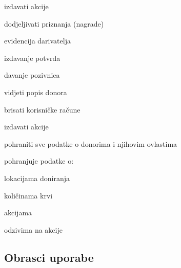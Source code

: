 \begin{packed_enum}
\begin{packed_enum}
					\end{packed_enum}
				\item  {}
				
				\begin{packed_enum}
					
					\item izdavati akcije
					\item dodjeljivati priznanja (nagrade)
					\item evidencija darivatelja
					\item izdavanje potvrda
					\item davanje pozivnica
				\end{packed_enum}

				\item {}
				\begin{packed_enum}
					
					\item vidjeti popis donora
					\item brisati korisničke račune
					\item izdavati akcije
				\end{packed_enum}
			
				\item {}
				\begin{packed_enum}
					
					\item pohraniti sve podatke o donorima i njihovim ovlastima
					\item pohranjuje podatke o:
						\begin{packed_enum}
						
							\item lokacijama doniranja
							\item količinama krvi
							\item akcijama
							\item odzivima na akcije
						\end{packed_enum}
				\end{packed_enum}
			
			\end{packed_enum}
			
			\eject 
			
			
				
			\subsection{Obrasci uporabe}
				
